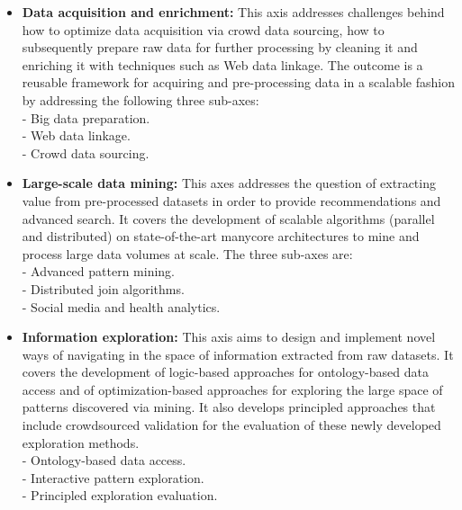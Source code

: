 \begin{itemize}

\item {\bf Data acquisition and enrichment:} This axis addresses
  challenges behind how to optimize data acquisition via crowd data
  sourcing, how to subsequently prepare raw data for further
  processing by cleaning it and enriching it with techniques such as
  Web data linkage. The outcome is a reusable framework for acquiring
  and pre-processing data in a scalable fashion by addressing the
  following three sub-axes:\\
- Big data preparation. \\
- Web data linkage. \\
- Crowd data sourcing.

\item {\bf Large-scale data mining:} This axes addresses the question
  of extracting value from pre-processed datasets in order to provide
  recommendations and advanced search. It covers the development of
  scalable algorithms (parallel and distributed) on state-of-the-art
  manycore architectures to mine and process large data volumes at
  scale. The three sub-axes are:\\
- Advanced pattern mining.\\
- Distributed join algorithms.\\
- Social media and health analytics.

\item {\bf Information exploration:} This axis aims to design and
  implement novel ways of navigating in the space of information
  extracted from raw datasets. It covers the development of
  logic-based approaches for ontology-based data access and of
  optimization-based approaches for exploring the large space of
  patterns discovered via mining. It also develops principled
  approaches that include crowdsourced validation for the evaluation
  of these newly developed exploration methods.\\
- Ontology-based data access.\\
- Interactive pattern exploration.\\
- Principled exploration evaluation.
\end{itemize}


